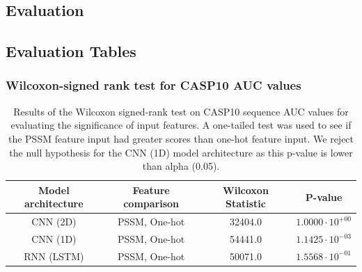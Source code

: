 \documentclass{l4proj}
\begin{document}
\begin{appendices}
\chapter{Evaluation}

\section{Evaluation Tables}

\subsection{Wilcoxon-signed rank test for CASP10 AUC values}
\label{chap:appendix sec:casp10auc}

\begin{table}[!htb]
    \centering
    \caption{Results of the Wilcoxon signed-rank test on CASP10 sequence AUC values for evaluating the significance of input features. A one-tailed test was used to see if the PSSM feature input had greater scores than one-hot feature input. We reject the null hypothesis for the CNN (1D) model architecture as this p-value is lower than alpha (0.05).}
    \begin{tabular}{@{}cccc@{}}
    \toprule
    Model architecture & Feature comparison & Wilcoxon Statistic & P-value \\ \midrule
    CNN (2D) & PSSM, One-hot & 32404.0 & $1.0000\cdot{10^{+00}}$ \\
    CNN (1D) & PSSM, One-hot & 54441.0 & $1.1425\cdot{10^{-03}}$ \\
    RNN (LSTM) & PSSM, One-hot & 50071.0 & $1.5568\cdot{10^{-01}}$ \\ \bottomrule
    \end{tabular}
    
    \label{tab:auccaspwilcinput}
\end{table}


\end{appendices}
\end{document}
